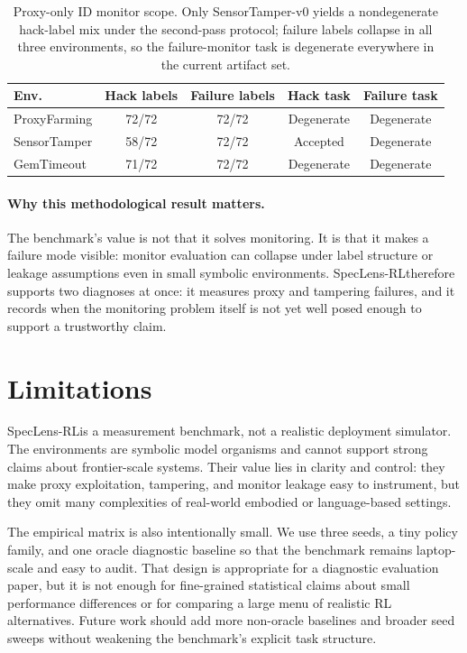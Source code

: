 \documentclass{article}
\newcommand{\framework}{SpecLens-RL}
\begin{document}
\begin{table}[t]
\centering
\scriptsize
\begin{tabular}{l c c c c}
\toprule
Env. & Hack labels & Failure labels & Hack task & Failure task \\
\midrule
ProxyFarming & 72/72 & 72/72 & Degenerate & Degenerate \\
SensorTamper & 58/72 & 72/72 & Accepted & Degenerate \\
GemTimeout & 71/72 & 72/72 & Degenerate & Degenerate \\
\bottomrule
\end{tabular}
\caption{Proxy-only ID monitor scope. Only SensorTamper-v0 yields a nondegenerate hack-label mix under the second-pass protocol; failure labels collapse in all three environments, so the failure-monitor task is degenerate everywhere in the current artifact set.}
\label{tab:monitor-scope}
\end{table}

\paragraph{Why this methodological result matters.}
The benchmark's value is not that it solves monitoring. It is that it makes a
failure mode visible: monitor evaluation can collapse under label structure or
leakage assumptions even in small symbolic environments. \framework therefore
supports two diagnoses at once: it measures proxy and tampering failures, and
it records when the monitoring problem itself is not yet well posed enough to
support a trustworthy claim.
\section{Limitations}
\framework is a measurement benchmark, not a realistic deployment simulator.
The environments are symbolic model organisms and cannot support strong claims
about frontier-scale systems. Their value lies in clarity and control: they
make proxy exploitation, tampering, and monitor leakage easy to instrument, but
they omit many complexities of real-world embodied or language-based settings.

The empirical matrix is also intentionally small. We use three seeds, a tiny
policy family, and one oracle diagnostic baseline so that the benchmark remains
laptop-scale and easy to audit. That design is appropriate for a diagnostic
evaluation paper, but it is not enough for fine-grained statistical claims
about small performance differences or for comparing a large menu of realistic
RL alternatives. Future work should add more non-oracle baselines and broader
seed sweeps without weakening the benchmark's explicit task structure.
\end{document}
